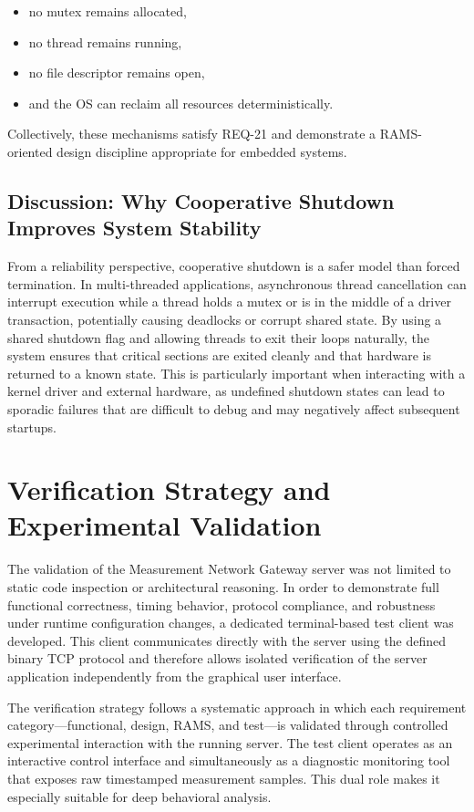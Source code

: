 \begin{itemize}
	\item no mutex remains allocated,
	\item no thread remains running,
	\item no file descriptor remains open,
	\item and the OS can reclaim all resources deterministically.
\end{itemize}

Collectively, these mechanisms satisfy REQ-21 and demonstrate a RAMS-oriented design discipline appropriate for embedded systems.

\subsection{Discussion: Why Cooperative Shutdown Improves System Stability}

From a reliability perspective, cooperative shutdown is a safer model than forced termination. In multi-threaded applications, asynchronous thread cancellation can interrupt execution while a thread holds a mutex or is in the middle of a driver transaction, potentially causing deadlocks or corrupt shared state. By using a shared shutdown flag and allowing threads to exit their loops naturally, the system ensures that critical sections are exited cleanly and that hardware is returned to a known state. This is particularly important when interacting with a kernel driver and external hardware, as undefined shutdown states can lead to sporadic failures that are difficult to debug and may negatively affect subsequent startups.

\section{Verification Strategy and Experimental Validation}

The validation of the Measurement Network Gateway server was not limited to static code inspection or architectural reasoning. In order to demonstrate full functional correctness, timing behavior, protocol compliance, and robustness under runtime configuration changes, a dedicated terminal-based test client was developed. This client communicates directly with the server using the defined binary TCP protocol and therefore allows isolated verification of the server application independently from the graphical user interface.

The verification strategy follows a systematic approach in which each requirement category—functional, design, RAMS, and test—is validated through controlled experimental interaction with the running server. The test client operates as an interactive control interface and simultaneously as a diagnostic monitoring tool that exposes raw timestamped measurement samples. This dual role makes it especially suitable for deep behavioral analysis.

